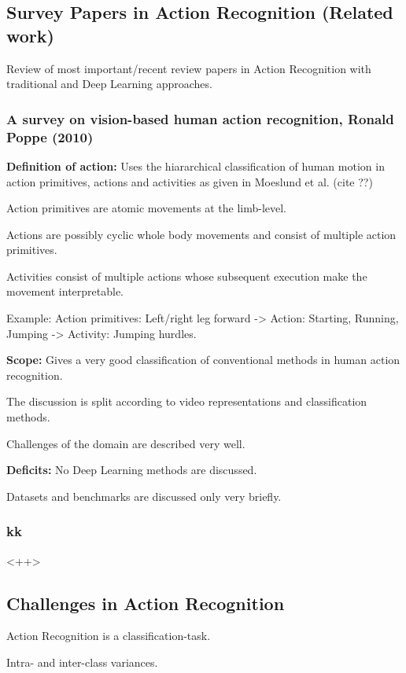 \documentclass{scrartcl}
\begin{document}
\subsection{Survey Papers in Action Recognition (Related work)}

Review of most important/recent review papers in Action Recognition with traditional and Deep Learning approaches.

\subsubsection{A survey on vision-based human action recognition, Ronald Poppe (2010)}

\textbf{Definition of action:} Uses the hiararchical classification of human motion in action primitives, actions and activities as given in Moeslund et al. (cite ??)

Action primitives are atomic movements at the limb-level.

Actions are possibly cyclic whole body movements and consist of multiple action primitives.

Activities consist of multiple actions whose subsequent execution make the movement interpretable.

Example: Action primitives: Left/right leg forward -> Action: Starting, Running, Jumping -> Activity: Jumping hurdles.

\textbf{Scope:} Gives a very good classification of conventional methods in human action recognition.

The discussion is split according to video representations and classification methods.

Challenges of the domain are described very well.

\textbf{Deficits:} No Deep Learning methods are discussed. 

Datasets and benchmarks are discussed only very briefly.

\subsubsection{kk}<++>


\subsection{Challenges in Action Recognition}
Action Recognition is a classification-task.

Intra- and inter-class variances.
\end{document}
